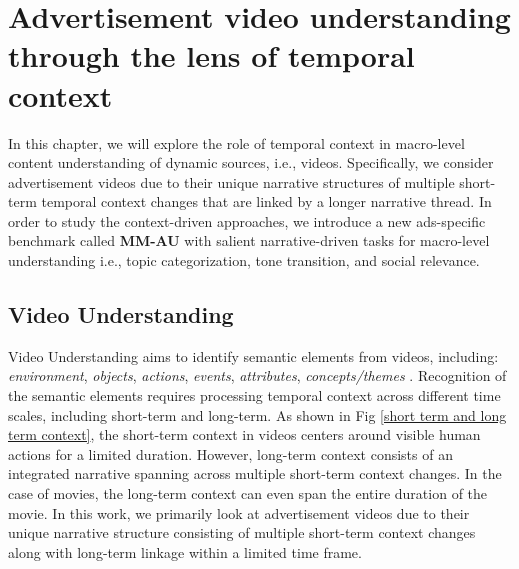 \chapter{Advertisement video understanding through the lens of temporal context}

In this chapter, we will explore the role of temporal context in macro-level content understanding of dynamic sources, i.e., videos. Specifically, we consider advertisement videos due to their unique narrative structures of multiple short-term temporal context changes that are linked by a longer narrative thread. In order to study the context-driven approaches, we introduce a new ads-specific benchmark called \textbf{MM-AU} with salient narrative-driven tasks for macro-level understanding i.e., topic categorization, tone transition, and social relevance. 

\section{Video Understanding}

Video Understanding aims to identify semantic elements from videos, including: \textit{environment}, \textit{objects}, \textit{actions}, \textit{events}, \textit{attributes}, \textit{concepts/themes} \cite{diba_large_2020}. Recognition of the semantic elements requires processing temporal context across different time scales, including short-term and long-term. As shown in Fig \ref{short term and long term context}, the short-term context in videos centers around visible human actions for a limited duration. However, long-term context consists of an integrated narrative spanning across multiple short-term context changes. In the case of movies, the long-term context can even span the entire duration of the movie. In this work, we primarily look at advertisement videos due to their unique narrative structure consisting of multiple short-term context changes along with long-term linkage within a limited time frame.

